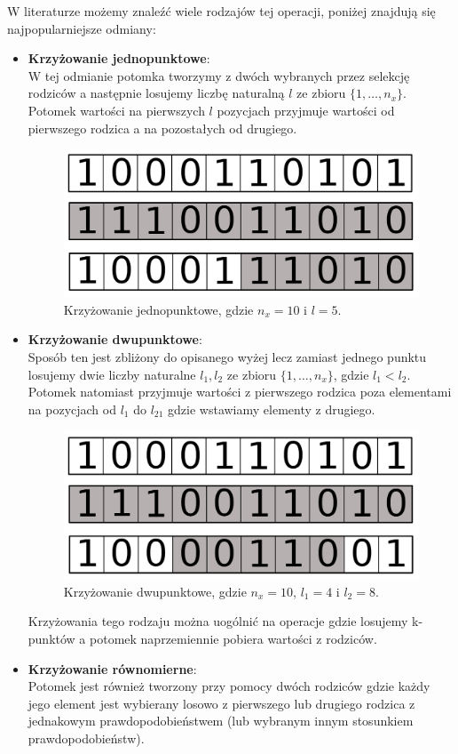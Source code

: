 \documentclass{article}
\begin{document}
W literaturze możemy znaleźć wiele rodzajów tej operacji, poniżej znajdują się najpopularniejsze
odmiany:
\begin{itemize}
\item \textbf{Krzyżowanie jednopunktowe}:\\
W tej odmianie potomka tworzymy z dwóch wybranych przez selekcję rodziców a następnie 
losujemy liczbę naturalną  $l$ ze zbioru $\{1,\ldots, n_x\}$.
Potomek wartości na pierwszych $l$ pozycjach przyjmuje wartości od pierwszego rodzica
a na pozostałych od drugiego.
\begin{figure}[H]
\centering
\includegraphics[scale=0.2]{crossover_v2.png}
\caption{Krzyżowanie jednopunktowe, gdzie $n_x = 10$ i $l = 5$.}
\end{figure}

\item \textbf{Krzyżowanie dwupunktowe}:\\
Sposób ten jest zbliżony do opisanego wyżej lecz zamiast jednego punktu losujemy dwie liczby
naturalne $l_1, l_2$ ze zbioru $\{1,\ldots, n_x\}$, gdzie $l_1 < l_2$.
Potomek natomiast przyjmuje wartości z pierwszego rodzica poza elementami na pozycjach od
$l_1$ do $l_21$ gdzie wstawiamy elementy z drugiego.

\begin{figure}[H]
\centering
\includegraphics[scale=0.2]{two_crossover_v2.png}
\caption{Krzyżowanie dwupunktowe, gdzie $n_x = 10$, $l_1 = 4$ i $l_2 = 8$.}
\end{figure}

Krzyżowania tego rodzaju można uogólnić na operacje gdzie losujemy k-punktów
a potomek naprzemiennie pobiera wartości z rodziców.\\
\item \textbf{Krzyżowanie równomierne}:\\
Potomek jest również tworzony przy pomocy dwóch rodziców gdzie każdy jego element jest
wybierany losowo z pierwszego lub drugiego rodzica z jednakowym prawdopodobieństwem 
(lub wybranym innym stosunkiem prawdopodobieństw).

\end{itemize}
\end{document}
